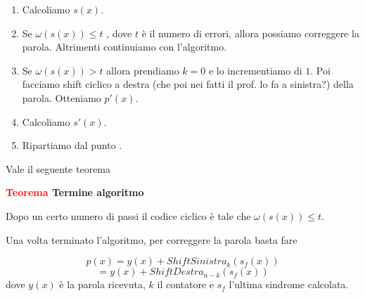 \documentclass[12pt]{report}
\begin{document}
    \begin{enumerate}
        \item Calcoliamo $s(x)$.
        \item Se $\omega(s(x)) \leq t$ , dove $t$ è il numero di errori, allora possiamo correggere la parola. Altrimenti continuiamo con l'algoritmo.
        \item Se $\omega(s(x)) > t$ allora prendiamo $k = 0$ e lo incrementiamo di $1$. Poi facciamo shift ciclico a destra (che poi nei fatti il prof. lo fa a sinistra?) della parola. Otteniamo $p'(x)$.
        \item Calcoliamo $s'(x)$.
        \item Ripartiamo dal punto .
    \end{enumerate}
    Vale il seguente teorema

    \vspace{5px}
    \begin{tcolorbox}
        \textbf{\textcolor{red}{Teorema} Termine algoritmo }
        \vspace{5px}
        \begin{center}

            Dopo un certo numero di passi il codice ciclico è tale che $\omega(s(x)) \leq t$.

        \end{center}
    \end{tcolorbox}

    \noindent
    Una volta terminato l'algoritmo, per correggere la parola basta fare

    $$p(x) = y(x) + ShiftSinistra_k(s_f(x))$$
    $$= y(x) + ShiftDestra_{n-k}(s_f(x))$$
    dove $y(x)$ è la parola ricevuta, $k$ il contatore e $s_f$ l'ultima sindrome calcolata.
\end{document}
